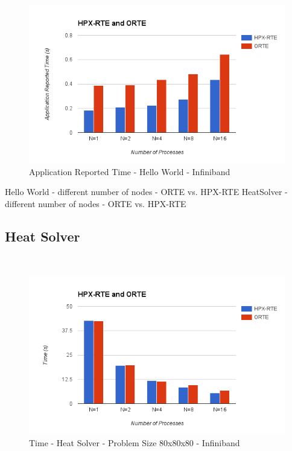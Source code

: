 \begin{figure}[h!]
\centering
\includegraphics[scale=0.7]{images/time-app-hello-world-infiniband.png}
\caption[Application Reported Time - Hello World - Infiniband]{Application Reported Time - Hello World - Infiniband}
\label{fig:time-app-hello-world-infiniband}
\end{figure}



Hello World - different number of nodes - ORTE vs. HPX-RTE
HeatSolver - different number of nodes - ORTE vs. HPX-RTE



\subsection{Heat Solver}
~\cite{resch1999comparison}

\begin{figure}[h!]
\centering
\includegraphics[scale=0.7]{images/time-all-heatsolver-80-infiniband.png}
\caption[Application Reported Time - Hello World - Infiniband]{Time - Heat Solver - Problem Size 80x80x80 - Infiniband}
\label{fig:time-all-heatsolver-80-infiniband.png}
\end{figure}


